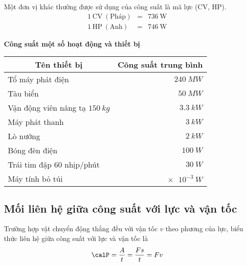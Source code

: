 Một đơn vị khác thường được sử dụng của công suất là mã lực (CV, HP).
\begin{eqnarray*}
	1\ \text{CV}\ (\text{Pháp}) &=& 736\ \text{W}\\
	1\ \text{HP}\ (\text{Anh}) &=& 746\ \text{W}		
\end{eqnarray*}
\begin{center}
	\textbf{Công suất một số hoạt động và thiết bị }
\end{center}
\begin{center}
	
	\begin{tabular}{|l|r|}
		\hline
		\multicolumn{1}{|c|}{\textbf{Tên thiết bị}} & \multicolumn{1}{c|}{\textbf{Công suất trung bình}} \\ \hline
		Tổ máy phát điện                            & $\SI{240}{MW}$                                     \\ \hline
		Tàu biển                                    & $\SI{50}{MW}$                                      \\ \hline
		Vận động viên nâng tạ $\SI{150}{kg}$        & $\SI{3.3}{kW}$                                     \\ \hline
		Máy phát thanh                              & $\SI{3}{kW}$                                       \\ \hline
		Lò nướng                                    & $\SI{2}{kW}$                                       \\ \hline
		Bóng đèn điện                               & $\SI{100}{W}$                                      \\ \hline
		Trái tim đập 60 nhịp/phút                   & $\SI{30}{W}$                                       \\ \hline
		Máy tính bỏ túi                             & $\SI{e-3}{W}$                                    \\ \hline
	\end{tabular}
	
\end{center}
\subsection{Mối liên hệ giữa công suất với lực và vận tốc}
Trường hợp vật chuyển động thẳng đều với vận tốc $v$ theo phương của lực, biểu thức liên hệ giữa công suất với lực và vận tốc là
$$\calP = \dfrac{A}{t} = \dfrac{Fs}{t}= Fv$$

